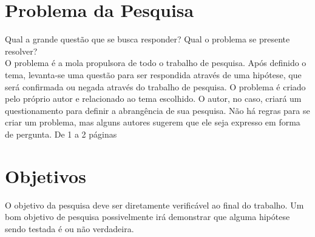 \documentclass[
    12pt,				       %
    openright,			       %
    oneside,			       %
    a4paper,			       %
    chapter=TITLE,             %
    sumario=tradicional,       %
    english,			        %
    brazil, 				    %
 ]{abntex2}
\begin{document}
%     


\section{Problema da Pesquisa}\label{sec:ProbPesq}
Qual a grande questão que se busca responder? Qual o problema se presente resolver? \\
O problema é a mola propulsora de todo o trabalho de pesquisa. Após definido o tema, levanta-se uma questão para ser respondida através de uma hipótese, que será confirmada ou negada através do trabalho de pesquisa. O problema é criado pelo próprio autor e relacionado ao tema escolhido. O autor, no caso, criará um questionamento para definir a abrangência de sua pesquisa. Não há regras para se criar um problema, mas alguns autores sugerem que ele seja expresso em forma de pergunta.
De 1 a 2 páginas

\section{Objetivos}\label{sec:objetivos}
O objetivo da pesquisa deve ser diretamente verificável ao final do trabalho. Um bom objetivo de pesquisa possivelmente irá demonstrar que alguma hipótese sendo testada é ou não verdadeira.

\end{document}
